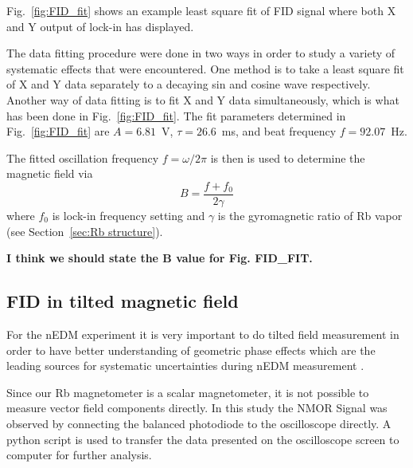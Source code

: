 Fig.~\ref{fig:FID_fit} shows an example least square fit of FID signal
where both X and Y output of lock-in has displayed.

The data fitting procedure were done in two ways in order to study a
variety of systematic effects that were encountered. One method is to
take a least square fit of X and Y data separately to a decaying sin
and cosine wave respectively.  Another way of data fitting is to fit X
and Y data simultaneously, which is what has been done in
Fig.~\ref{fig:FID_fit}.  The fit parameters determined in
Fig.~\ref{fig:FID_fit} are $A=6.81$~V, $\tau=26.6$~ms, and beat
frequency $f=92.07$~Hz.

The fitted oscillation frequency $f=\omega/2\pi$ is then is used to
determine the magnetic field via
\begin{equation}
B=\frac{f+f_0}{2\gamma}\label{eq:field}
\end{equation}
where $f_0$ is lock-in frequency setting and $\gamma$ is the
gyromagnetic ratio of Rb vapor (see Section~\ref{sec:Rb structure}).

{\bf I think we should state the B value for Fig. FID_FIT.}

 




\subsection{FID in tilted magnetic field}

For the nEDM experiment it is very important to do tilted field measurement in order to have better understanding of  geometric phase effects which are the leading sources for systematic uncertainties during nEDM measurement . 




Since our Rb magnetometer is a scalar magnetometer, it is not possible to measure vector field components directly. In this study the NMOR Signal was observed by connecting the balanced photodiode to the oscilloscope directly. A python script is used to transfer the data presented on the oscilloscope screen to computer for further analysis. 

